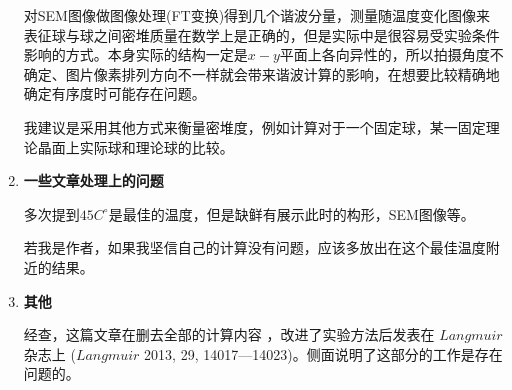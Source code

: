 \documentclass[UTF8]{ctexart}
\begin{document}
\begin{enumerate}
	对SEM图像做图像处理(FT变换)得到几个谐波分量，测量随温度变化图像来表征球与球之间密堆质量在数学上是正确的，但是实际中是很容易受实验条件影响的方式。本身实际的结构一定是$x-y$平面上各向异性的，所以拍摄角度不确定、图片像素排列方向不一样就会带来谐波计算的影响，在想要比较精确地确定有序度时可能存在问题。
	
	我建议是采用其他方式来衡量密堆度，例如计算对于一个固定球，某一固定理论晶面上实际球和理论球的比较。
	
	\item \textbf{一些文章处理上的问题}
	
	多次提到$45C^\circ$是最佳的温度，但是缺鲜有展示此时的构形，SEM图像等。
	
	若我是作者，如果我坚信自己的计算没有问题，应该多放出在这个最佳温度附近的结果。
	
	\item \textbf{其他}
	
	经查，这篇文章在删去全部的计算内容 ，改进了实验方法后发表在 $ Langmuir $ 杂志上 ($ Langmuir $ 2013, 29, 14017---14023)。侧面说明了这部分的工作是存在问题的。
		
	\end{enumerate}
	
	
	
	
	

	
\end{document}
